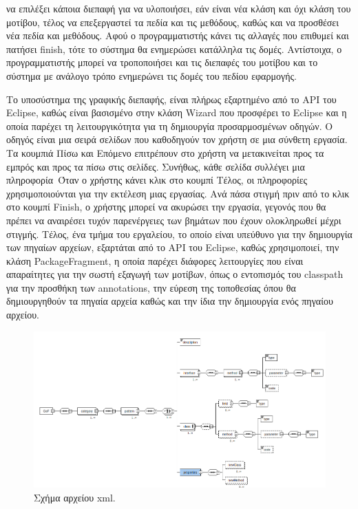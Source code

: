 να επιλέξει κάποια διεπαφή για να υλοποιήσει, εάν είναι νέα κλάση και όχι κλάση του μοτίβου, 
τέλος να επεξεργαστεί τα πεδία και τις μεθόδους, καθώς και να προσθέσει νέα πεδία και μεθόδους. Αφού ο προγραμματιστής κάνει τις 
αλλαγές που επιθυμεί και πατήσει finish, τότε το σύστημα θα ενημερώσει κατάλληλα τις δομές. 
Αντίστοιχα, ο προγραμματιστής μπορεί να τροποποιήσει και τις διεπαφές του μοτίβου και το σύστημα με ανάλογο τρόπο ενημερώνει 
τις δομές του πεδίου εφαρμογής. \par
Το υποσύστημα της γραφικής διεπαφής, είναι πλήρως εξαρτημένο από το API του Eclipse, καθώς είναι 
βασισμένο στην κλάση Wizard που προσφέρει το Eclipse και η οποία παρέχει τη λειτουργικότητα για τη δημιουργία 
προσαρμοσμένων οδηγών. Ο οδηγός είναι μια σειρά σελίδων που καθοδηγούν τον χρήστη σε μια σύνθετη εργασία. 
Τα κουμπιά Πίσω και Επόμενο επιτρέπουν στο χρήστη να μετακινείται προς τα εμπρός και προς τα πίσω στις σελίδες. 
Συνήθως, κάθε σελίδα συλλέγει μια πληροφορία\anotelia \  Όταν ο χρήστης κάνει κλικ στο κουμπί Τέλος, οι πληροφορίες χρησιμοποιούνται 
για την εκτέλεση μιας εργασίας. Ανά πάσα στιγμή πριν από το κλικ στο κουμπί Finish, ο χρήστης μπορεί να ακυρώσει την εργασία, 
γεγονός που θα πρέπει να αναιρέσει τυχόν παρενέργειες των βημάτων που έχουν ολοκληρωθεί μέχρι στιγμής. Τέλος, ένα τμήμα 
του εργαλείου, το οποίο είναι υπεύθυνο για την δημιουργία των πηγαίων αρχείων, εξαρτάται από το API του Eclipse, καθώς χρησιμοποιεί, 
την κλάση PackageFragment, η οποία παρέχει διάφορες λειτουργίες που είναι απαραίτητες για την σωστή εξαγωγή των μοτίβων, 
όπως ο εντοπισμός του classpath για την προσθήκη των annotations, την εύρεση της τοποθεσίας όπου θα δημιουργηθούν τα πηγαία αρχεία 
καθώς και την ίδια την δημιουργία ενός πηγαίου αρχείου.
\begin{figure}[H]
    \centering
    \includegraphics[scale=0.5]{Figures/xsd_diagram.png}
    \caption{Σχήμα αρχείου xml.}
    \label{fig:xsd}
\end{figure}
